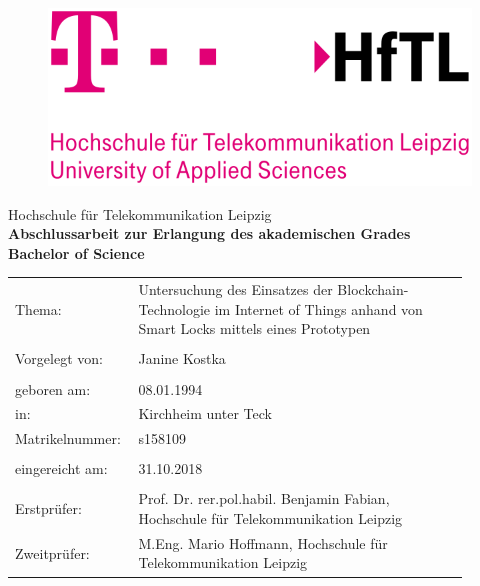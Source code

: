 \documentclass[toc=sectionentrywithdots,a4paper,12pt,oneside]{scrartcl}
\newcommand{\grad}{Bachelor of Science}
\newcommand{\matrinr}{s158109}
\newcommand{\thema}{Untersuchung des Einsatzes der Blockchain-Technologie im Internet of Things anhand  von Smart Locks mittels eines Prototypen}
\newcommand{\name}{Janine Kostka}
\newcommand{\geb}{08.01.1994}
\newcommand{\ort}{Kirchheim unter Teck}
\newcommand{\erstp}{Prof. Dr. rer.pol.habil. Benjamin Fabian}
\newcommand{\instituterst}{Hochschule für Telekommunikation Leipzig}
\newcommand{\zweitp}{M.Eng. Mario Hoffmann}
\newcommand{\institutzweit}{Hochschule für Telekommunikation Leipzig}
\newcommand{\abgabe}{31.10.2018}
\begin{document}
	\begin{titlepage}
    \begin{spacing}{1.0}
		\begin{figure}[h]
			\includegraphics[scale=0.2]{hftl_logo.png}
		\end{figure}
		\vspace*{20pt}
		\centering
		Hochschule für Telekommunikation Leipzig\\
		\vspace*{40pt}
		\large \textbf{Abschlussarbeit zur Erlangung des akademischen Grades}\\
		\doublespacing
		\textbf{\grad} %
		\vspace*{100pt}
		\begin{table}[h!]
			\begin{tabular}{p{0.2\linewidth}p{0.7\linewidth}}
				Thema: & \large \thema \\
				\\[5em]
				Vorgelegt von: & \large \name  \\
				\\[2em]
				geboren am: & \geb \\
				in: & \ort \\
				Matrikelnummer: & \matrinr \\
			 	\\[2em]
			 	eingereicht am: & \abgabe \\
			 	\\[2em]
			 	Erstprüfer: & \erstp, \instituterst \\
			 	Zweitprüfer: & \zweitp, \institutzweit \\
			\end{tabular}
		\end{table}
	\normalsize
	\end{spacing}
	\end{titlepage}
\end{document}
